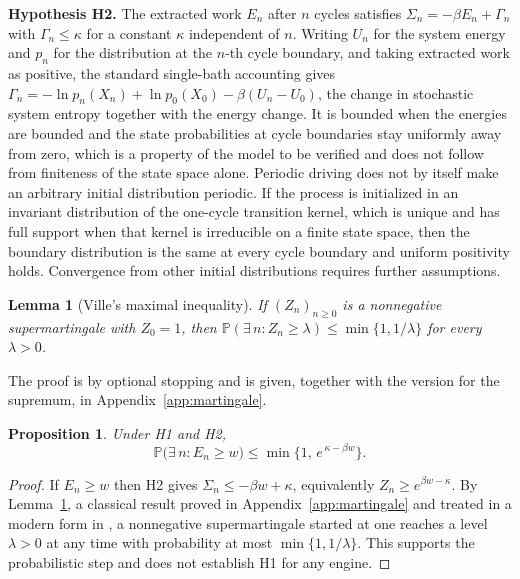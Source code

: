\documentclass[11pt]{article}
\newtheorem{proposition}{Proposition}
\newtheorem{lemma}{Lemma}
\theoremstyle{definition}
\theoremstyle{remark}
\renewcommand{\Pr}{\mathbb{P}}
\begin{document}
\medskip
\noindent\textbf{Hypothesis H2.} The extracted work $E_n$ after $n$ cycles satisfies $\Sigma_n = -\beta E_n + \Gamma_n$ with $\Gamma_n \le \kappa$ for a constant $\kappa$ independent of $n$. Writing $U_n$ for the system energy and $p_n$ for the distribution at the $n$-th cycle boundary, and taking extracted work as positive, the standard single-bath accounting gives $\Gamma_n = -\ln p_n(X_n) + \ln p_0(X_0) - \beta (U_n - U_0)$, the change in stochastic system entropy together with the energy change. It is bounded when the energies are bounded and the state probabilities at cycle boundaries stay uniformly away from zero, which is a property of the model to be verified and does not follow from finiteness of the state space alone. Periodic driving does not by itself make an arbitrary initial distribution periodic. If the process is initialized in an invariant distribution of the one-cycle transition kernel, which is unique and has full support when that kernel is irreducible on a finite state space, then the boundary distribution is the same at every cycle boundary and uniform positivity holds. Convergence from other initial distributions requires further assumptions.

\begin{lemma}[Ville's maximal inequality]\label{lem:ville}
If $(Z_n)_{n \ge 0}$ is a nonnegative supermartingale with $Z_0 = 1$, then $\Pr(\exists\, n : Z_n \ge \lambda) \le \min\{1, 1/\lambda\}$ for every $\lambda > 0$.
\end{lemma}

The proof is by optional stopping and is given, together with the version for the supremum, in Appendix~\ref{app:martingale}.

\begin{proposition}\label{prop:ville}
Under H1 and H2,
\[
\Pr\big(\exists\, n : E_n \ge w\big) \le \min\{1,\, e^{\,\kappa - \beta w}\} .
\]
\end{proposition}

\begin{proof}
If $E_n \ge w$ then H2 gives $\Sigma_n \le -\beta w + \kappa$, equivalently $Z_n \ge e^{\beta w - \kappa}$. By Lemma~\ref{lem:ville}, a classical result proved in Appendix~\ref{app:martingale} and treated in a modern form in \cite{doob1953,howard2020}, a nonnegative supermartingale started at one reaches a level $\lambda > 0$ at any time with probability at most $\min\{1, 1/\lambda\}$. This supports the probabilistic step and does not establish H1 for any engine.
\end{proof}
\end{document}
